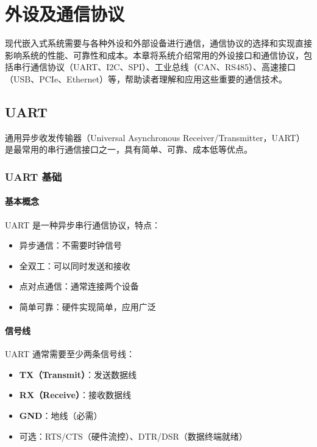 \chapter{外设及通信协议}

现代嵌入式系统需要与各种外设和外部设备进行通信，通信协议的选择和实现直接影响系统的性能、可靠性和成本。本章将系统介绍常用的外设接口和通信协议，包括串行通信协议（UART、I2C、SPI）、工业总线（CAN、RS485）、高速接口（USB、PCIe、Ethernet）等，帮助读者理解和应用这些重要的通信技术。

\section{UART}

通用异步收发传输器（Universal Asynchronous Receiver/Transmitter，UART）是最常用的串行通信接口之一，具有简单、可靠、成本低等优点。

\subsection{UART 基础}

\subsubsection{基本概念}

UART 是一种异步串行通信协议，特点：
\begin{itemize}
  \item 异步通信：不需要时钟信号
  \item 全双工：可以同时发送和接收
  \item 点对点通信：通常连接两个设备
  \item 简单可靠：硬件实现简单，应用广泛
\end{itemize}

\subsubsection{信号线}

UART 通常需要至少两条信号线：
\begin{itemize}
  \item \textbf{TX（Transmit）}：发送数据线
  \item \textbf{RX（Receive）}：接收数据线
  \item \textbf{GND}：地线（必需）
  \item 可选：RTS/CTS（硬件流控）、DTR/DSR（数据终端就绪）
\end{itemize}

